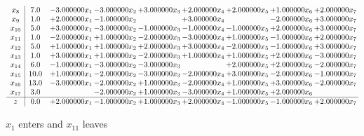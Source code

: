 \documentclass[10pt]{article}
\begin{document}
\[\begin{array}{c| c c@{\hskip 2pt} c@{\hskip 2pt} c@{\hskip 2pt} c@{\hskip 2pt} c@{\hskip 2pt} c@{\hskip 2pt} c@{\hskip 2pt} }
 x_{8}   &  7.0 & -3.000000 x_{1} & -3.000000 x_{2} & + 3.000000 x_{3} & + 2.000000 x_{4} & + 2.000000 x_{5} & + 1.000000 x_{6} & + 2.000000 x_{7}\\
 x_{9}   &  1.0 & + 2.000000 x_{1} & -1.000000 x_{2} &   & + 3.000000 x_{4} &   & -2.000000 x_{6} & + 3.000000 x_{7}\\
 x_{10}   &  5.0 & + 3.000000 x_{1} & -3.000000 x_{2} & -1.000000 x_{3} & -1.000000 x_{4} & -1.000000 x_{5} & + 2.000000 x_{6} & + 3.000000 x_{7}\\
 x_{11}   &  1.0 & -2.000000 x_{1} & + 1.000000 x_{2} & -2.000000 x_{3} & -3.000000 x_{4} & + 1.000000 x_{5} & -1.000000 x_{6} & + 2.000000 x_{7}\\
 x_{12}   &  5.0 & + 1.000000 x_{1} & + 1.000000 x_{2} & + 2.000000 x_{3} & + 3.000000 x_{4} & -2.000000 x_{5} & -1.000000 x_{6} & + 3.000000 x_{7}\\
 x_{13}   &  1.0 & + 3.000000 x_{1} & + 1.000000 x_{2} & -2.000000 x_{3} & + 1.000000 x_{4} & + 1.000000 x_{5} & + 2.000000 x_{6} & -3.000000 x_{7}\\
 x_{14}   &  6.0 & -1.000000 x_{1} & -3.000000 x_{2} & -3.000000 x_{3} &   & + 2.000000 x_{5} & + 2.000000 x_{6} & -2.000000 x_{7}\\
 x_{15}   &  10.0 & + 1.000000 x_{1} & -2.000000 x_{2} & -3.000000 x_{3} & -2.000000 x_{4} & + 3.000000 x_{5} & -2.000000 x_{6} & -1.000000 x_{7}\\
 x_{16}   &  13.0 & -3.000000 x_{1} & -2.000000 x_{2} & + 1.000000 x_{3} & -2.000000 x_{4} & + 1.000000 x_{5} & + 3.000000 x_{6} & -2.000000 x_{7}\\
 x_{17}   &  3.0  &   & -2.000000 x_{2} & + 1.000000 x_{3} & -3.000000 x_{4} & + 1.000000 x_{5} & + 2.000000 x_{6} &   \\
\hline
z    &  0.0 & + 2.000000 x_{1} & -1.000000 x_{2} & + 1.000000 x_{3} & + 2.000000 x_{4} & -1.000000 x_{5} & -1.000000 x_{6} & + 2.000000 x_{7}\\
\end{array}\]


 $ x_{1} $ enters and $ x_{11} $ leaves 
\end{document}
